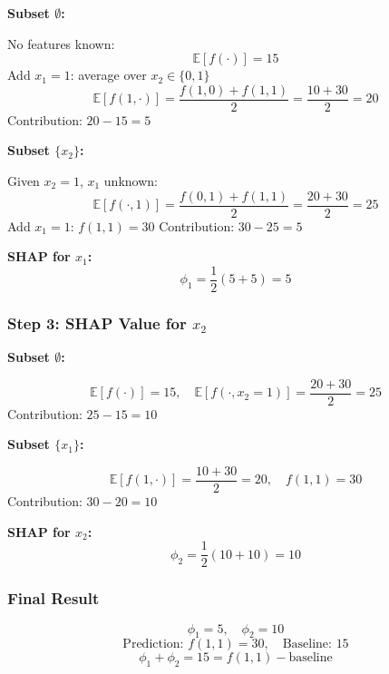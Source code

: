 \documentclass{article}
\begin{document}
\begin{multicols}{2}
	\textbf{Subset \(\emptyset\):}

	No features known:
	\[
		\mathbb{E}[f(\cdot)] = 15
	\]
	Add \( x_1 = 1 \): average over \( x_2 \in \{0,1\} \)
	\[
		\mathbb{E}[f(1, \cdot)] = \frac{f(1,0) + f(1,1)}{2} = \frac{10 + 30}{2} = 20
	\]
	Contribution: \( 20 - 15 = 5 \)

	\medskip
	\textbf{Subset \(\{x_2\}\):}

	Given \( x_2 = 1 \), \( x_1 \) unknown:
	\[
		\mathbb{E}[f(\cdot, 1)] = \frac{f(0,1) + f(1,1)}{2} = \frac{20 + 30}{2} = 25
	\]
	Add \( x_1 = 1 \): \( f(1,1) = 30 \)
	Contribution: \( 30 - 25 = 5 \)

	\medskip
	\textbf{SHAP for \( x_1 \):}
	\[
		\phi_1 = \frac{1}{2}(5 + 5) = 5
	\]

	\subsubsection{Step 3: SHAP Value for \( x_2 \)}

	\textbf{Subset \(\emptyset\):}

	\[
		\mathbb{E}[f(\cdot)] = 15, \quad
		\mathbb{E}[f(\cdot, x_2=1)] = \frac{20 + 30}{2} = 25
	\]
	Contribution: \( 25 - 15 = 10 \)

	\medskip
	\textbf{Subset \(\{x_1\}\):}

	\[
		\mathbb{E}[f(1, \cdot)] = \frac{10 + 30}{2} = 20, \quad f(1,1) = 30
	\]
	Contribution: \( 30 - 20 = 10 \)

	\medskip
	\textbf{SHAP for \( x_2 \):}
	\[
		\phi_2 = \frac{1}{2}(10 + 10) = 10
	\]

	\subsubsection{Final Result}

	\[
		\phi_1 = 5, \quad \phi_2 = 10
	\]
	\[
		\text{Prediction: } f(1,1) = 30, \quad \text{Baseline: } 15
	\]
	\[
		\phi_1 + \phi_2 = 15 = f(1,1) - \text{baseline}
	\]


\end{multicols}
\end{document}
